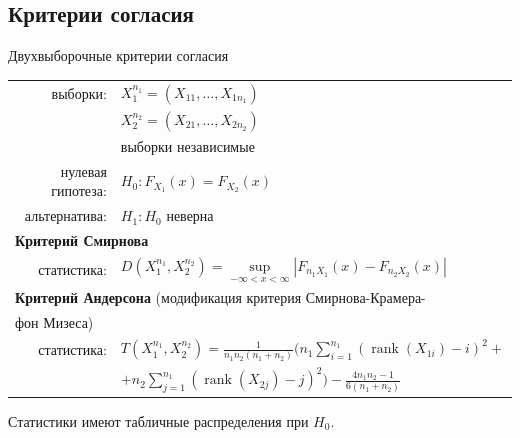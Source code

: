 \documentclass[11pt,pdf,utf8,hyperref={unicode},aspectratio=169]{beamer}
\DeclareMathOperator{\rank}{rank}
\begin{document}
\subsection{Критерии согласия}
\begin{frame}{Двухвыборочные критерии согласия}
   \begin{center}
     \begin{tabular}{rl}
         выборки:                        & $X_1^{n_1}=\left(X_{11},\ldots,X_{1n_1}\right)$ \\
                                         & $X_2^{n_2}=\left(X_{21},\ldots,X_{2n_2}\right)$ \\
                                         & выборки независимые \\
         нулевая гипотеза:               & $H_0\colon F_{X_1} \left(x\right) = F_{X_2} \left(x\right)$ \\
         альтернатива:                   & $H_1\colon H_0$ неверна \bigskip \\
         \multicolumn{2}{l}{\textbf{Критерий Смирнова}}\\
         статистика:                        & $D\left(X_1^{n_1}, X_2^{n_2}\right) = \sup\limits_{-\infty<x<\infty} \left|F_{n_1X_1} \left(x\right) - F_{n_2 X_2} \left(x\right)\right|$  \bigskip \\
         \multicolumn{2}{l}{\textbf{Критерий Андерсона} (модификация критерия Смирнова-Крамера-}\\
         \multicolumn{2}{l}{фон Мизеса)}\\
         статистика:                        & $T\left(X_1^{n_1}, X_2^{n_2}\right) = \frac1{n_1n_2\left(n_1+n_2\right)} \Biggl( n_1\sum\limits_{i=1}^{n_1} \left(\rank\left(X_{1i}\right) - i\right)^2 + $\\
                                            & \;\;\; $ + n_2 \sum\limits_{j=1}^{n_1} \left(\rank\left(X_{2j}\right) - j\right)^2 \Biggr) - \frac{4n_1n_2-1}{6\left(n_1+n_2\right)}$
     \end{tabular}
 \end{center}

 \bigskip

 Статистики имеют табличные распределения при $H_0$.
\end{frame}
\end{document}
